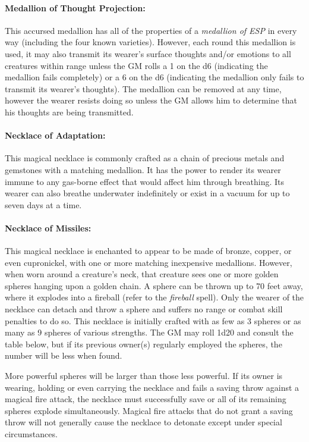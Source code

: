 \begin{multicols}{2}
\paragraph{Medallion of Thought Projection:} This accursed medallion has all of the properties of a \textit{medallion of ESP} in every way (including the four known varieties).  However, each round this medallion is used, it may also transmit its wearer's surface thoughts and/or emotions to all creatures within range unless the GM rolls a 1 on the d6 (indicating the medallion fails completely) or a 6 on the d6 (indicating the medallion only fails to transmit its wearer's thoughts).  The medallion can be removed at any time, however the wearer resists doing so unless the GM allows him to determine that his thoughts are being transmitted.

\paragraph{Necklace of Adaptation:} This magical necklace is commonly crafted as a chain of precious metals and gemstones with a matching medallion.  It has the power to render its wearer immune to any gas-borne effect that would affect him through breathing.  Its wearer can also breathe underwater indefinitely or exist in a vacuum for up to seven days at a time.

\paragraph{Necklace of Missiles:} This magical necklace is enchanted to appear to be made of bronze, copper, or even cupronickel, with one or more matching inexpensive medallions.  However, when worn around a creature's neck, that creature sees one or more golden spheres hanging upon a golden chain.  A sphere can be thrown up to 70 feet away, where it explodes into a fireball (refer to the \textit{fireball} spell).  Only the wearer of the necklace can detach and throw a sphere and suffers no range or combat skill penalties to do so.  This necklace is initially crafted with as few as 3 spheres or as many as 9 spheres of various strengths.   The GM may roll 1d20 and consult the table below, but if its previous owner(s) regularly employed the spheres, the number will be less when found.

More powerful spheres will be larger than those less powerful.  If its owner is wearing, holding or even carrying the necklace and fails a saving throw against a magical fire attack, the necklace must successfully save or all of its remaining spheres explode simultaneously.  Magical fire attacks that do not grant a saving throw will not generally cause the necklace to detonate except under special circumstances.


\end{multicols}
